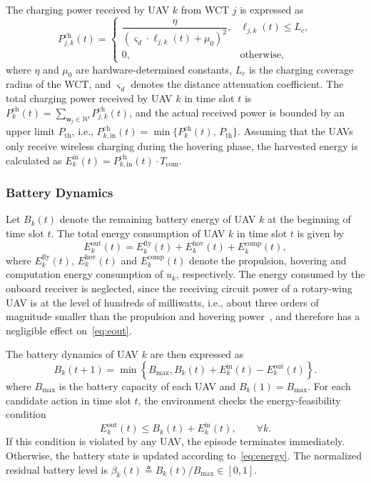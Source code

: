 \documentclass[journal]{IEEEtran}
\begin{document}
The charging power received by UAV $k$ from WCT $j$ is expressed as
\begin{equation}\label{eq:charge_power}
P_{j,k}^{\mathrm{ch}}(t) = \begin{cases}
\dfrac{\eta}{(\varsigma_d \cdot \ell_{j,k}(t) + \mu_0)^2}, & \ell_{j,k}(t) \le L_c, \\[4pt]
0, & \text{otherwise},
\end{cases}
\end{equation}
where $\eta$ and $\mu_0$ are hardware-determined constants, $L_c$ is the charging coverage radius of the WCT, and $\varsigma_d$ denotes the distance attenuation coefficient. The total charging power received by UAV $k$ in time slot $t$ is $P_k^{\mathrm{ch}}(t) = \sum_{\mathsf{w}_j\in\mathcal{W}}P_{j,k}^{\mathrm{ch}}(t)$, and the actual received power is bounded by an upper limit $P_{\mathrm{th}}$, i.e., $P_{k,\mathrm{in}}^{\mathrm{ch}}(t) = \min\{P_k^{\mathrm{ch}}(t),\, P_{\mathrm{th}}\}$. Assuming that the UAVs only receive wireless charging during the hovering phase, the harvested energy is calculated as $E_k^{\mathrm{in}}(t) = P_{k,\mathrm{in}}^{\mathrm{ch}}(t) \cdot T_{\mathrm{com}}$.
\subsubsection{Battery Dynamics}
Let \(B_k(t)\) denote the remaining battery energy of UAV \(k\) at the
beginning of time slot \(t\). The total energy consumption of UAV \(k\)
in time slot \(t\) is given by
\begin{equation}\label{eq:eout}
E_k^{\mathrm{out}}(t)
=
E_k^{\mathrm{fly}}(t)
+
E_k^{\mathrm{hov}}(t)
+
E_k^{\mathrm{comp}}(t),
\end{equation}
where $E^{\mathrm{fly}}_k(t)$, $E^{\mathrm{hov}}_k(t)$ and $E^{\mathrm{comp}}_k(t)$
denote the propulsion, hovering and computation energy consumption of $u_k$,
respectively. The energy consumed by the onboard receiver is neglected, since
the receiving circuit power of a rotary-wing UAV is at the level of hundreds of
milliwatts, i.e., about three orders of magnitude smaller than the propulsion
and hovering power~\cite{zeng2019energy}, and therefore has a negligible effect on~\eqref{eq:eout}.

The battery dynamics of UAV \(k\) are then expressed as
\begin{equation}\label{eq:energy}
B_k(t+1)
=
\min \left\{
B_{\max},
B_k(t)+E_k^{\mathrm{in}}(t)-E_k^{\mathrm{out}}(t)
\right\}.
\end{equation}
where $B_{\max}$ is the battery capacity of each UAV and
$B_k(1)=B_{\max}$. For each candidate action in time slot $t$, the
environment checks the energy-feasibility condition
\begin{equation}\label{eq:energy_feasibility}
E_k^{\mathrm{out}}(t)
\le
B_k(t)+E_k^{\mathrm{in}}(t),
\qquad \forall k.
\end{equation}
If this condition is violated by any UAV, the episode terminates immediately.
Otherwise, the battery state is updated according to~\eqref{eq:energy}.
The normalized residual battery level is
$\beta_k(t)\triangleq B_k(t)/B_{\max}\in[0,1]$.
\end{document}
